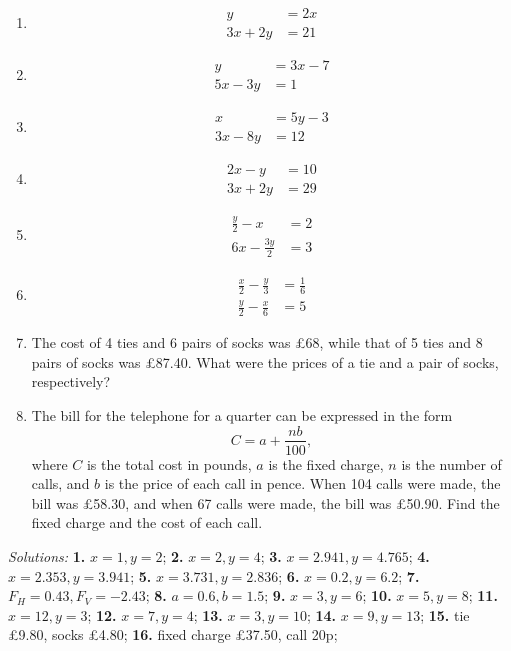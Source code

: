 \documentclass[
  english,
  12pt,
  oneside]{book}
\theoremstyle{definition}
\theoremstyle{definition}
\theoremstyle{definition}
\theoremstyle{definition}
\theoremstyle{remark}
\begin{document}
\begin{enumerate}
\def\labelenumi{\arabic{enumi}.}
\setcounter{enumi}{8}
\item
  \begin{align*}
  y &= 2x\\
  3x+2y &= 21
  \end{align*}
\item
  \begin{align*}
     y &= 3x-7\\
     5x-3y &= 1
     \end{align*}
\item
  \begin{align*}
     x &= 5y-3\\
     3x-8y &= 12
     \end{align*}
\item
  \begin{align*}
     2x -y &= 10\\
     3x+2y &= 29
     \end{align*}
\item
  \begin{align*}
     \frac{y}{2}-x &= 2\\
     6x-\frac{3y}{2} &= 3
     \end{align*}
\item
  \begin{align*}
     \frac{x}{2}-\frac{y}{3} &= \frac{1}{6}\\
     \frac{y}{2}-\frac{x}{6} &= 5
     \end{align*}
\item
  The cost of 4 ties and 6 pairs of socks was £68, while that of 5 ties and 8 pairs of
  socks was £87.40. What were the prices of a tie and a pair of socks, respectively?
\item
  The bill for the telephone for a quarter can be expressed in the form
  \[C = a+ \frac{nb}{100},\]
  where \(C\) is the total cost in pounds, \(a\) is the fixed charge, \(n\) is the
  number of calls, and \(b\) is the price of each call in pence. When 104 calls
  were made, the bill was £58.30, and when 67 calls were made, the bill was £50.90.
  Find the fixed charge and the cost of each call.
\end{enumerate}

\emph{Solutions:} \textbf{1.} \(x=1,y=2\); \textbf{2.} \(x=2,y=4\); \textbf{3.} \(x=2.941, y=4.765\);
\textbf{4.} \(x=2.353,y=3.941\); \textbf{5.} \(x=3.731, y=2.836\); \textbf{6.} \(x=0.2,y=6.2\);
\textbf{7.} \(F_H=0.43, F_V=-2.43\); \textbf{8.} \(a=0.6,b=1.5\);
\textbf{9.} \(x=3, y=6\); \textbf{10.} \(x=5,y=8\); \textbf{11.} \(x=12, y=3\); \textbf{12.} \(x=7,y=4\);
\textbf{13.} \(x=3,y=10\); \textbf{14.} \(x=9,y=13\); \textbf{15.} tie £9.80, socks £4.80;
\textbf{16.} fixed charge £37.50, call 20p;
\end{document}
